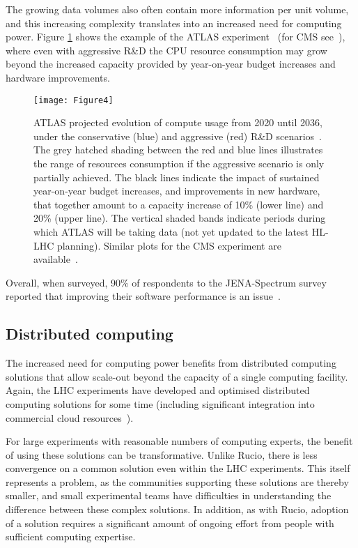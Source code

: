 The growing data volumes also often contain more information per unit volume, and this increasing complexity translates into an increased need for computing power.  Figure \ref{figures:Fig4} shows the example of the ATLAS experiment~\cite{CERN-LHCC-2022-005} (for CMS see~\cite{Software:2815292}), where even with aggressive R\&D the CPU resource consumption may grow beyond the increased capacity provided by year-on-year budget increases and hardware improvements.


\begin{figure}[htbp]
    \begin{center}
        \texttt{[image: Figure4]} \\ 
        \caption{ATLAS projected evolution of compute usage from 2020 until 2036, under the conservative (blue) and aggressive (red) R\&D scenarios~\cite{CERN-LHCC-2022-005}. The grey hatched shading between the red and blue lines illustrates the range of resources consumption if the aggressive scenario is only partially achieved. The black lines indicate the impact of sustained year-on-year budget increases, and improvements in new hardware, that together amount to a capacity increase of 10\% (lower line) and 20\% (upper line). The vertical shaded bands indicate periods during which ATLAS will be taking data  (not yet updated to the latest HL-LHC planning). Similar plots for the CMS experiment are available~\cite{Software:2815292}. }
        \label{figures:Fig4}
    \end{center}
\end{figure}


Overall, when surveyed, 90\% of respondents to the JENA-Spectrum survey reported that improving their software performance is an issue~\cite{JENA-Spectrum-Survey-Report}.



\subsection{Distributed computing}


The increased need for computing power benefits from distributed computing solutions that allow scale-out beyond the capacity of a single computing facility. Again, the LHC experiments have developed and optimised distributed computing solutions for some time (including significant integration into commercial cloud resources~\cite{Megino_2024}).

For large experiments with reasonable numbers of computing experts, the benefit of using these solutions can be transformative. Unlike Rucio, there is less convergence on a common solution even within the LHC experiments. This itself represents a problem, as the communities supporting these solutions are thereby smaller, and small experimental teams have difficulties in understanding the difference between these complex solutions. In addition, as with Rucio, adoption of a solution requires a significant amount of ongoing effort from people with sufficient computing expertise.



